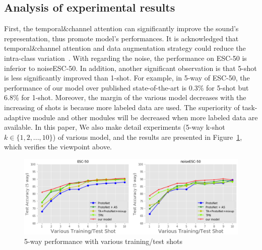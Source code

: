 \documentclass[a4paper]{article}
\begin{document}
\subsection{Analysis of experimental results}
\vspace{-2mm}
First, the temporal\&channel attention can significantly improve the sound's representation, thus promote model's performances. It is acknowledged that
temporal\&channel attention and data augmentation strategy could reduce the intra-class variation~\cite{dataaug}.
With regarding the noise, the performance on ESC-50 is inferior to noiseESC-50. 
In addition, another significant observation is that 5-shot is less significantly improved than 1-shot.
For example, in 5-way of ESC-50, the performance of our model over published state-of-the-art is 0.3\% for 5-shot but 6.8\% for 1-shot. 
Moreover, the margin of the various model decreases with the increasing of shots is because more labeled data are used. The superiority of task-adaptive module and other modules will be decreased when more labeled data are available. 
In this paper, We also make detail experiments (5-way k-shot $k \in \{1,2,...,10\}$) of various model, and the results are presented in Figure~\ref{fig:fig_exp_1}, which verifies the viewpoint above.
\vspace{-3mm}
\begin{figure}[t]
	\centering
	\includegraphics[width=\linewidth]{./pic/exp_8.png}
	\caption{5-way performance with various training/test shots}
	\label{fig:fig_exp_1}
	\vspace{-3mm}
\end{figure}
\end{document}
